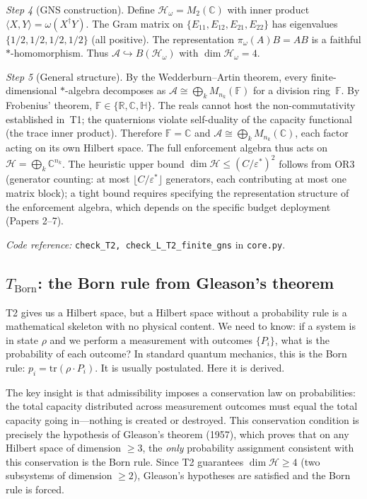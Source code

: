 \documentclass[11pt]{article}
\newcommand{\coderef}[2]{\smallskip\noindent\textit{Code reference:} \texttt{#1} in \texttt{#2}.}
\begin{document}
\begin{tcolorbox}[apfbox, title={T2: Noncommutativity $\to$ Operator Algebra on Hilbert Space}]
\textit{Step 4} (GNS construction).  Define $\mathcal{H}_\omega = M_2(\mathbb{C})$ with inner product $\langle X, Y \rangle = \omega(X^\dagger Y)$.  The Gram matrix on $\{E_{11}, E_{12}, E_{21}, E_{22}\}$ has eigenvalues $\{1/2, 1/2, 1/2, 1/2\}$ (all positive).  The representation $\pi_\omega(A)B = AB$ is a faithful $*$-homomorphism.  Thus $\mathcal{A} \hookrightarrow B(\mathcal{H}_\omega)$ with $\dim \mathcal{H}_\omega = 4$.

\textit{Step 5} (General structure).  By the Wedderburn--Artin theorem, every finite-dimensional $*$-algebra decomposes as $\mathcal{A} \cong \bigoplus_k M_{n_k}(\mathbb{F})$ for a division ring~$\mathbb{F}$.  By Frobenius' theorem, $\mathbb{F} \in \{\mathbb{R}, \mathbb{C}, \mathbb{H}\}$.  The reals cannot host the non-commutativity established in~T1; the quaternions violate self-duality of the capacity functional (the trace inner product).  Therefore $\mathbb{F} = \mathbb{C}$ and $\mathcal{A} \cong \bigoplus_k M_{n_k}(\mathbb{C})$, each factor acting on its own Hilbert space.  The full enforcement algebra thus acts on $\mathcal{H} = \bigoplus_k \mathbb{C}^{n_k}$.  The heuristic upper bound $\dim \mathcal{H} \le (C/\varepsilon^*)^2$ follows from OR3 (generator counting: at most $\lfloor C/\varepsilon^* \rfloor$ generators, each contributing at most one matrix block); a tight bound requires specifying the representation structure of the enforcement algebra, which depends on the specific budget deployment (Papers 2--7).

\coderef{check\_T2, check\_L\_T2\_finite\_gns}{core.py}
\end{tcolorbox}


\subsection{\texorpdfstring{$T_{\mathrm{Born}}$}{T Born}: the Born rule from Gleason's theorem}

T2 gives us a Hilbert space, but a Hilbert space without a probability rule is a mathematical skeleton with no physical content.  We need to know: if a system is in state $\rho$ and we perform a measurement with outcomes $\{P_i\}$, what is the probability of each outcome?  In standard quantum mechanics, this is the Born rule: $p_i = \mathrm{tr}(\rho \cdot P_i)$.  It is usually postulated.  Here it is derived.

The key insight is that admissibility imposes a conservation law on probabilities: the total capacity distributed across measurement outcomes must equal the total capacity going in---nothing is created or destroyed.  This conservation condition is precisely the hypothesis of Gleason's theorem (1957), which proves that on any Hilbert space of dimension $\ge 3$, the \emph{only} probability assignment consistent with this conservation is the Born rule.  Since T2 guarantees $\dim \mathcal{H} \ge 4$ (two subsystems of dimension $\ge 2$), Gleason's hypotheses are satisfied and the Born rule is forced.
\end{document}
